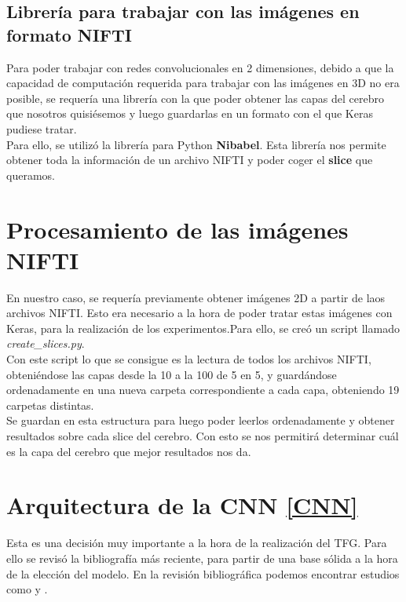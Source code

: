 \subsection{Librería para trabajar con las imágenes en formato NIFTI}
\label{nibabel}
Para poder trabajar con redes convolucionales en 2 dimensiones, debido a que la capacidad de computación requerida para trabajar con las imágenes en 3D no era posible, se requería una librería con la que poder obtener las capas del cerebro que nosotros quisiésemos y luego guardarlas en un formato con el que Keras pudiese tratar.\\
Para ello, se utilizó la librería para Python \textbf{Nibabel}\cite{Nibabel}. Esta librería nos permite obtener toda la información de un archivo NIFTI y poder coger el \textbf{slice} que queramos.\\
\section{Procesamiento de las imágenes NIFTI}
\label{procesamiento-imagenes}
En nuestro caso, se requería previamente obtener imágenes 2D a partir de laos archivos NIFTI. Esto era necesario a la hora de poder tratar estas imágenes con Keras, para la realización de los experimentos.Para ello, se creó un script llamado \textit{create\_slices.py}.\\

Con este script lo que se consigue es la lectura de todos los archivos NIFTI, obteniéndose las capas desde la 10 a la 100 de 5 en 5, y guardándose ordenadamente en una nueva carpeta correspondiente a cada capa, obteniendo 19 carpetas distintas.\\

Se guardan en esta estructura para luego poder leerlos ordenadamente y obtener resultados sobre cada slice del cerebro. Con esto se nos permitirá determinar cuál es la capa del
cerebro que mejor resultados nos da.\\
\section{Arquitectura de la CNN  \ref{CNN}}

Esta es una decisión muy importante a la hora de la realización del TFG. Para ello se revisó la bibliografía más reciente, para partir de una base sólida a la hora de la elección del modelo. En la revisión bibliográfica podemos encontrar estudios como \cite{residualVGG} y \cite{SarrafT16}.\\

